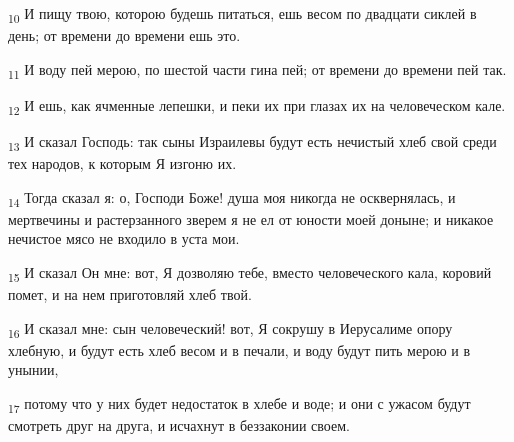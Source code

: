 \begin{tcolorbox}
\textsubscript{10} И пищу твою, которою будешь питаться, ешь весом по двадцати сиклей в день; от времени до времени ешь это.
\end{tcolorbox}
\begin{tcolorbox}
\textsubscript{11} И воду пей мерою, по шестой части гина пей; от времени до времени пей так.
\end{tcolorbox}
\begin{tcolorbox}
\textsubscript{12} И ешь, как ячменные лепешки, и пеки их при глазах их на человеческом кале.
\end{tcolorbox}
\begin{tcolorbox}
\textsubscript{13} И сказал Господь: так сыны Израилевы будут есть нечистый хлеб свой среди тех народов, к которым Я изгоню их.
\end{tcolorbox}
\begin{tcolorbox}
\textsubscript{14} Тогда сказал я: о, Господи Боже! душа моя никогда не осквернялась, и мертвечины и растерзанного зверем я не ел от юности моей доныне; и никакое нечистое мясо не входило в уста мои.
\end{tcolorbox}
\begin{tcolorbox}
\textsubscript{15} И сказал Он мне: вот, Я дозволяю тебе, вместо человеческого кала, коровий помет, и на нем приготовляй хлеб твой.
\end{tcolorbox}
\begin{tcolorbox}
\textsubscript{16} И сказал мне: сын человеческий! вот, Я сокрушу в Иерусалиме опору хлебную, и будут есть хлеб весом и в печали, и воду будут пить мерою и в унынии,
\end{tcolorbox}
\begin{tcolorbox}
\textsubscript{17} потому что у них будет недостаток в хлебе и воде; и они с ужасом будут смотреть друг на друга, и исчахнут в беззаконии своем.
\end{tcolorbox}
